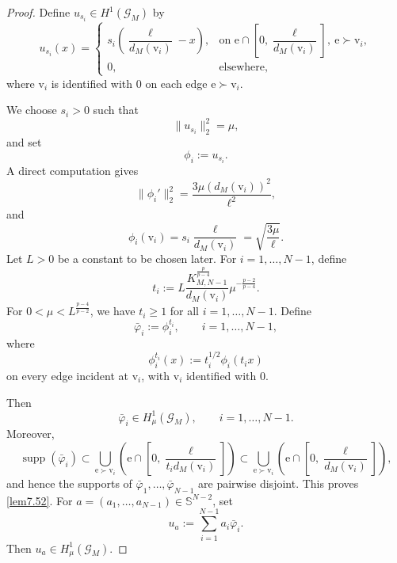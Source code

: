\documentclass[10pt,a4paper]{amsart}
\newcommand{\G}{\mathcal{G}}
\newcommand{\e}{\mathrm{e}}
\newcommand{\vv}{\mathrm{v}}
\begin{document}
\begin{proof}
Define $u_{s_i}\in H^1(\G_M)$ by
$$
u_{s_i}(x)=
\begin{cases}
s_i\left(\dfrac{\ell}{d_M(\vv_i)}-x\right),
&\text{on } \e\cap\left[0,\dfrac{\ell}{d_M(\vv_i)}\right],\ \e\succ\vv_i,\\
0,
&\text{elsewhere},
\end{cases}
$$
where $\vv_i$ is identified with $0$ on each edge $\e\succ\vv_i$.

We choose $s_i>0$ such that
$$
\|u_{s_i}\|_2^2=\mu,
$$
and set
$$
\phi_i:=u_{s_i}.
$$
A direct computation gives
$$
\|\phi_i'\|_2^2
=
\frac{3\mu \left(d_M(\vv_i)\right)^2}{\ell^2},
$$
and
$$
\phi_i(\vv_i)
=
s_i\frac{\ell}{d_M(\vv_i)}
=
\sqrt{\frac{3\mu}{\ell}}.
$$
Let $L>0$ be a constant to be chosen later. For $i=1,\ldots,N-1$, define
$$
t_i
:=
L\frac{K^{\frac{p}{p-4}}_{M,N-1}}{d_M(\vv_i)}
\mu^{-\frac{p-2}{p-4}}.
$$
For $0<\mu<L^\frac{p-4}{p-2}$, we have
$t_i\geq1$ for all $i=1,\ldots,N-1$.
Define
$$
\bar{\varphi}_i:=\phi_i^{t_i},
\qquad i=1,\ldots,N-1,
$$
where
$$
\phi_i^{t_i}(x):=t_i^{1/2}\phi_i(t_ix)
$$
on every edge incident at $\vv_i$, with $\vv_i$ identified with $0$.

Then
$$
\bar{\varphi}_i\in H^1_\mu(\G_M),
\qquad i=1,\ldots,N-1.
$$
Moreover,
$$
\operatorname{supp}(\bar{\varphi}_i)
\subset
\bigcup_{\e\succ\vv_i}
\left(
\e\cap\left[0,\frac{\ell}{t_id_M(\vv_i)}\right]
\right)
\subset
\bigcup_{\e\succ\vv_i}
\left(
\e\cap\left[0,\frac{\ell}{d_M(\vv_i)}\right]
\right),
$$
and hence the supports of
$\bar{\varphi}_1,\ldots,\bar{\varphi}_{N-1}$ are pairwise disjoint. This proves \ref{lem7.52}.
For $a=(a_1,\ldots,a_{N-1})\in\mathbb S^{N-2}$, set
$$
u_a:=\sum_{i=1}^{N-1}a_i\bar{\varphi}_i.
$$
Then $u_a\in H^1_\mu(\G_M)$.


\end{proof}
\end{document}
